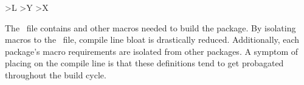 \begin{description}
\begin{table}
\begin{center}
\begin{tabularx}{\linewidth}{
          >{\setlength{\hsize}{.9\hsize}}L %
          >{\setlength{\hsize}{.3\hsize}}Y %
          >{\setlength{\hsize}{1.6\hsize}}X}
        \hline\hline
      \end{tabularx}
    \end{center}
  \end{table}
\item[\comp{config.h.in}] The \confhin\ file 
  contains  and other  macros needed to build 
  the package.  By isolating macros to the \confhin\ file, compile
  line bloat is drastically reduced.  Additionally, each package's
  macro requirements are isolated from other packages.  A symptom of
  placing  on the compile line is that these
  definitions tend to get probagated throughout the build cycle.
\end{description}

